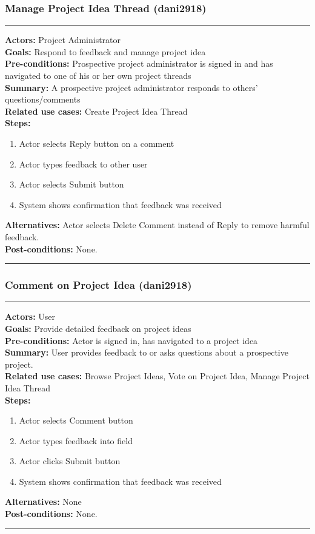 \documentclass[11pt]{report}
\begin{document}
\subsubsection{Manage Project Idea Thread (dani2918)}
\vspace{2pt}
\hrule
\vspace{8pt}
 \textbf{Actors:} Project Administrator \\ 
 \textbf{Goals:} Respond to feedback and manage project idea  \\
 \textbf{Pre-conditions:} Prospective project administrator is signed in and has navigated to one of his or her own project threads  \\
 \textbf{Summary:}  A prospective project administrator responds to others' questions/comments \\ 
 \textbf{Related use cases:} Create Project Idea Thread \\ 
 \textbf{Steps:} \begin{enumerate}
  \item Actor selects Reply button on a comment
  \item Actor types feedback to other user
  \item Actor selects Submit button 
  \item System shows confirmation that feedback was received 
  
 \end{enumerate}
 \textbf{Alternatives:} Actor selects Delete Comment instead of Reply to remove harmful feedback. \\
 \textbf{Post-conditions:} None. \\
 \vspace{8pt}
\hrule
\newpage
\subsubsection{Comment on Project Idea (dani2918)}
\vspace{2pt}
\hrule
\vspace{8pt}
 \textbf{Actors:} User \\ 
 \textbf{Goals:} Provide detailed feedback on project ideas  \\
 \textbf{Pre-conditions:} Actor is signed in, has navigated to a project idea  \\
 \textbf{Summary:}  User provides feedback to or asks questions about a prospective project. \\ 
 \textbf{Related use cases:} Browse Project Ideas, Vote on Project Idea, Manage Project Idea Thread \\ 
 \textbf{Steps:} \begin{enumerate}
  \item Actor selects Comment button
  \item Actor types feedback into field 
  \item Actor clicks Submit button
  \item System shows confirmation that feedback was received 
 \end{enumerate}
 \textbf{Alternatives:} None \\
 \textbf{Post-conditions:} None. \\
 \vspace{8pt}
\hrule
\newpage
\end{document}
